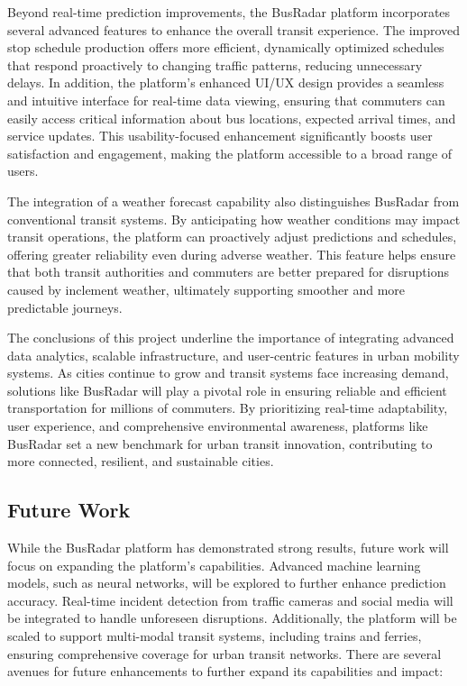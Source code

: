 \documentclass[conference]{IEEEtran}
\begin{document}
Beyond real-time prediction improvements, the BusRadar platform incorporates several advanced features to enhance the overall transit experience. The improved stop schedule production offers more efficient, dynamically optimized schedules that respond proactively to changing traffic patterns, reducing unnecessary delays. In addition, the platform’s enhanced UI/UX design provides a seamless and intuitive interface for real-time data viewing, ensuring that commuters can easily access critical information about bus locations, expected arrival times, and service updates. This usability-focused enhancement significantly boosts user satisfaction and engagement, making the platform accessible to a broad range of users.

The integration of a weather forecast capability also distinguishes BusRadar from conventional transit systems. By anticipating how weather conditions may impact transit operations, the platform can proactively adjust predictions and schedules, offering greater reliability even during adverse weather. This feature helps ensure that both transit authorities and commuters are better prepared for disruptions caused by inclement weather, ultimately supporting smoother and more predictable journeys.

The conclusions of this project underline the importance of integrating advanced data analytics, scalable infrastructure, and user-centric features in urban mobility systems. As cities continue to grow and transit systems face increasing demand, solutions like BusRadar will play a pivotal role in ensuring reliable and efficient transportation for millions of commuters. By prioritizing real-time adaptability, user experience, and comprehensive environmental awareness, platforms like BusRadar set a new benchmark for urban transit innovation, contributing to more connected, resilient, and sustainable cities.

\subsection{Future Work}
While the BusRadar platform has demonstrated strong results, future work will focus on expanding the platform’s capabilities. Advanced machine learning models, such as neural networks, will be explored to further enhance prediction accuracy. Real-time incident detection from traffic cameras and social media will be integrated to handle unforeseen disruptions. Additionally, the platform will be scaled to support multi-modal transit systems, including trains and ferries, ensuring comprehensive coverage for urban transit networks. There are several avenues for future enhancements to further expand its capabilities and impact: 
\end{document}
